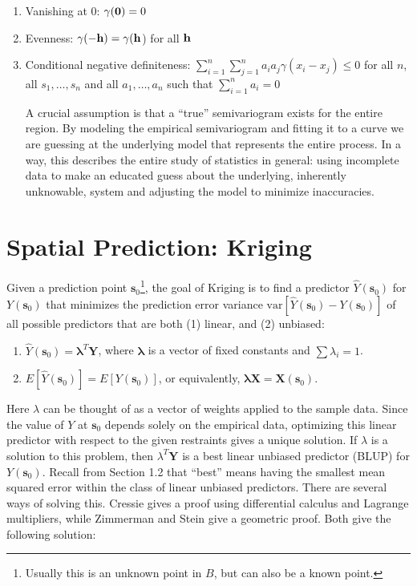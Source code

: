 \documentclass[12pt,twoside]{reedthesis}
\begin{document}
\begin{enumerate}

\item Vanishing at 0: $\gamma(\bold{0}) = 0$
\item Evenness: $\gamma(-\bold{h}) = \gamma(\bold{h}$) for all $\bold{h}$
\item Conditional negative definiteness: $\sum_{i=1}^n \sum_{j=1}^n a_i a_j \gamma(x_i - x_j) \leq 0$ for all $n$, all $s_1, \dots, s_n$ and all $a_1, \dots, a_n$ such that $\sum_{i=1}^n a_i = 0$

A crucial assumption is that a ``true'' semivariogram exists for the entire region. By modeling the empirical semivariogram and fitting it to a curve we are guessing at the underlying model that represents the entire process. In a way, this describes the entire study of statistics in general: using incomplete data to make an educated guess about the underlying, inherently unknowable, system and adjusting the model to minimize inaccuracies.

\end{enumerate}



\section{Spatial Prediction: Kriging}
Given a prediction point $\mathbf{s}_0$\footnote{Usually this is an unknown point in $B$, but can also be a known point.}, the goal of Kriging is to find a predictor $\hat Y(\mathbf{s}_0)$ for $Y(\mathbf{s}_0)$ that minimizes the prediction error variance $\text{var}[\hat Y(\mathbf{s}_0) - Y(\mathbf{s}_0)]$ of all possible predictors that are both (1) linear, and  (2) unbiased:

\begin{enumerate}
\item $\hat Y(\mathbf{s}_0) = \boldsymbol{\lambda}^T\mathbf{Y}$, where $\boldsymbol{\lambda}$ is a vector of fixed constants and $\sum \lambda_i = 1$. 
\item $E[\hat Y(\mathbf{s}_0)] = E[Y(\mathbf{s}_0)]$, or equivalently, $\boldsymbol{\lambda}\mathbf{X} = \mathbf{X}(\mathbf{s}_0)$.
\end{enumerate}

Here $\lambda$ can be thought of as a vector of weights applied to the sample data. Since the value of $Y$ at $\mathbf{s}_0$ depends solely on the empirical data, optimizing this linear predictor with respect to the given restraints gives a unique solution. If $\lambda$ is a solution to this problem, then $\lambda^T\mathbf{Y}$ is a best linear unbiased predictor (BLUP) for $Y(\mathbf{s}_0)$. Recall from Section 1.2 that ``best'' means having the smallest mean squared error within the class of linear unbiased predictors. There are several ways of solving this. Cressie \cite{cressie:1993} gives a proof using differential calculus and Lagrange multipliers, while Zimmerman and Stein \cite{gelfand:2010} give a geometric proof. Both give the following solution:
\end{document}
